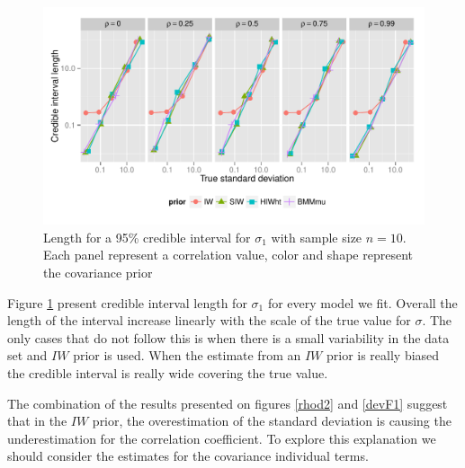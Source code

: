 \documentclass[a4paper]{article}
\begin{document}
\begin{figure}[htbp]
   \centering
   \includegraphics[width=\textwidth]{cilength_s1}
    \vspace{-.5in}
   \caption{Length for a 95\% credible interval for $\sigma_1$ with sample size $n=10$. Each panel represent a correlation value,  color and shape represent the covariance prior \label{devF3} }
\end{figure}
Figure \ref{devF3} present credible interval length for $\sigma_1$ for every model we fit. Overall the length of the interval increase linearly with the scale of the true value for $\sigma$. The only cases that do not follow this is when there is a small variability in the data set and $IW$ prior is used. When the estimate from an $IW$  prior is really biased the credible interval is really wide covering the true value. 

The combination of the results presented on figures \ref{rhod2} and \ref{devF1}  suggest that in the $IW$ prior, the overestimation of the standard deviation is causing the underestimation for the correlation coefficient. To explore this explanation we should consider the estimates for the covariance individual terms. 
\end{document}
